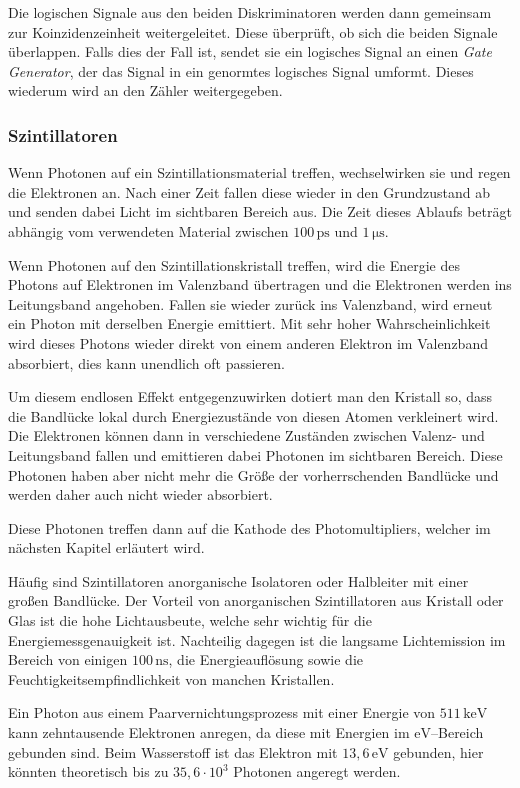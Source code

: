 \documentclass[12pt,a4paper]{scrartcl}
\numberwithin{equation}{section} %
\newcommand{\pu}[1]{\ensuremath{\mathrm{#1}}}
\begin{document}
Die logischen Signale aus den beiden Diskriminatoren werden dann gemeinsam zur Koinzidenzeinheit weitergeleitet. Diese überprüft, ob sich die beiden Signale überlappen. Falls dies der Fall ist, sendet sie ein logisches Signal an einen \emph{Gate Generator}, der das Signal in ein genormtes logisches Signal umformt. Dieses wiederum wird an den Zähler weitergegeben.

\hypertarget{szintillatoren}{%
\subsubsection{Szintillatoren}\label{szintillatoren}}
Wenn Photonen auf ein Szintillationsmaterial treffen, wechselwirken sie und regen die Elektronen an. Nach einer Zeit fallen diese wieder in den Grundzustand ab und senden dabei Licht im sichtbaren Bereich aus. Die Zeit dieses Ablaufs beträgt abhängig vom verwendeten Material zwischen $\pu{100\, ps}$ und $\pu{1\,\mu s}$.

Wenn Photonen auf den Szintillationskristall treffen, wird die Energie des Photons auf Elektronen im Valenzband übertragen und die Elektronen werden ins Leitungsband angehoben. Fallen sie wieder zurück ins Valenzband, wird erneut ein Photon mit derselben Energie emittiert. Mit sehr hoher Wahrscheinlichkeit wird dieses Photons wieder direkt von einem anderen Elektron im Valenzband absorbiert, dies kann unendlich oft passieren.

Um diesem endlosen Effekt entgegenzuwirken dotiert man den Kristall so, dass die Bandlücke lokal durch Energiezustände von diesen Atomen verkleinert wird. Die Elektronen können dann in verschiedene Zuständen zwischen Valenz- und Leitungsband fallen und emittieren dabei Photonen im sichtbaren Bereich. Diese Photonen haben aber nicht mehr die Größe der vorherrschenden Bandlücke und werden daher auch nicht wieder absorbiert.

Diese Photonen treffen dann auf die Kathode des Photomultipliers, welcher im nächsten Kapitel erläutert wird.

Häufig sind Szintillatoren anorganische Isolatoren oder Halbleiter mit einer großen Bandlücke. Der Vorteil von anorganischen Szintillatoren aus Kristall oder Glas ist die hohe Lichtausbeute, welche sehr wichtig für die Energiemessgenauigkeit ist. Nachteilig dagegen ist die langsame Lichtemission im Bereich von einigen $\pu{100\, ns}$, die Energieauflösung sowie die Feuchtigkeitsempfindlichkeit von manchen Kristallen.

Ein Photon aus einem Paarvernichtungsprozess mit einer Energie von $\pu{511\,keV}$ kann zehntausende Elektronen anregen, da diese mit Energien im $\pu{eV}$--Bereich gebunden sind. Beim Wasserstoff ist das Elektron mit $\pu{13,6\,eV}$ gebunden, hier könnten theoretisch bis zu $35,6\cdot 10^3$ Photonen angeregt werden.
\end{document}
